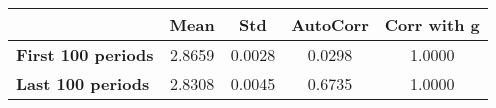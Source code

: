 \begin{tiny}\begin{tabular}{|l|c|c|c|c|}
\hline
&\textbf{Mean}&\textbf{Std}&\textbf{AutoCorr}&\textbf{Corr with g}\\\hline
\textbf{First 100 periods}&2.8659&0.0028&0.0298&1.0000\\\hline
\textbf{Last 100 periods}&2.8308&0.0045&0.6735&1.0000\\\hline
\end{tabular}
\end{tiny}